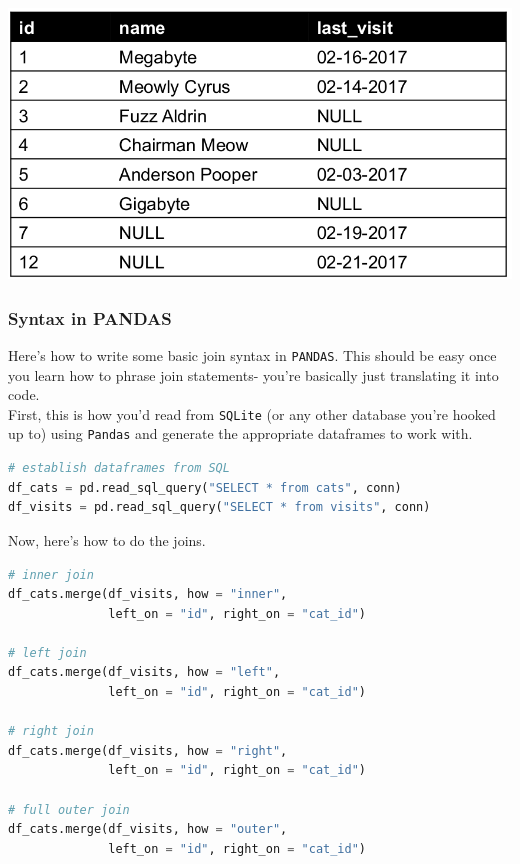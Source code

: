 \documentclass[english, 10pt]{article}
\begin{document}
\begin{itemize}
	\includegraphics[scale=0.35]{img/table_8.png}\\
	
\end{itemize}

\subsubsection{Syntax in PANDAS}

Here's how to write some basic join syntax in \texttt{PANDAS}. This should be easy once you learn how to phrase join statements- you're basically just translating it into code.\\

First, this is how you'd read from \texttt{SQLite} (or any other database you're hooked up to) using \texttt{Pandas} and generate the appropriate dataframes to work with.\\

{\centering
\begin{lstlisting}[language=python]
# establish dataframes from SQL
df_cats = pd.read_sql_query("SELECT * from cats", conn)
df_visits = pd.read_sql_query("SELECT * from visits", conn)
\end{lstlisting}
}

\hfill \break Now, here's how to do the joins.

{\centering
\begin{lstlisting}[language=python]
# inner join
df_cats.merge(df_visits, how = "inner",
              left_on = "id", right_on = "cat_id")
              
# left join
df_cats.merge(df_visits, how = "left",
              left_on = "id", right_on = "cat_id")
              
# right join
df_cats.merge(df_visits, how = "right",
              left_on = "id", right_on = "cat_id")
              
# full outer join
df_cats.merge(df_visits, how = "outer",
              left_on = "id", right_on = "cat_id")
\end{lstlisting}
}
\end{document}
